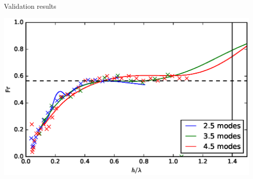 \documentclass[12pt]{beamer}
\begin{document}
\begin{frame}{Validation results}
\begin{center}
\includegraphics[height=0.90\textheight]{graphics/Fr.eps}
\end{center}
\end{frame}
\end{document}
